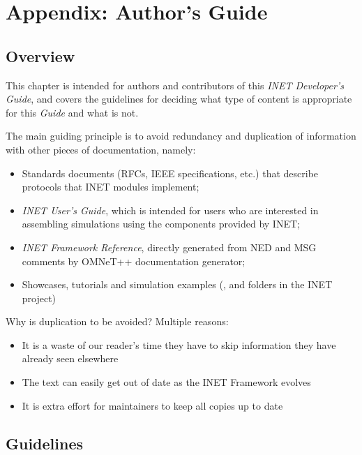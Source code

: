 \chapter{Appendix: Author's Guide}
\label{cha:authors-guide}


\section{Overview}

This chapter is intended for authors and contributors of this 
\textit{INET Developer's Guide}, and covers the guidelines for deciding
what type of content is appropriate for this \textit{Guide} and 
what is not.

The main guiding principle is to avoid redundancy and duplication
of information with other pieces of documentation, namely:

\begin{itemize}
  \item Standards documents (RFCs, IEEE specifications, etc.) that
    describe protocols that INET modules implement;
  \item \textit{INET User's Guide}, which is intended for users who
    are interested in assembling simulations using the components
    provided by INET;
  \item \textit{INET Framework Reference}, directly generated from 
    NED and MSG comments by OMNeT++ documentation generator;
  \item Showcases, tutorials and simulation examples (,
     and  folders in the INET project)
\end{itemize}

Why is duplication to be avoided? Multiple reasons:

\begin{itemize}
  \item It is a waste of our reader's time they have to skip information
     they have already seen elsewhere
  \item The text can easily get out of date as the INET Framework evolves
  \item It is extra effort for maintainers to keep all copies up to date  
\end{itemize}


\section{Guidelines}

